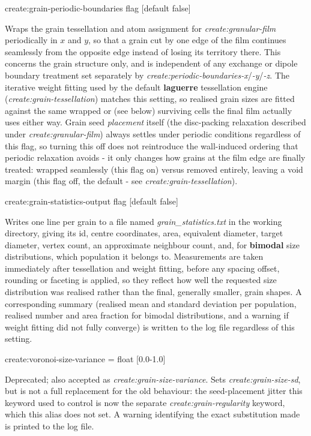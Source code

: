 {\zicf create:grain-periodic-boundaries flag [default false]} Wraps the grain tessellation and atom assignment for \textit{create:granular-film} periodically in $x$ and $y$, so that a grain cut by one edge of the film continues seamlessly from the opposite edge instead of losing its territory there. This concerns the grain structure only, and is independent of any exchange or dipole boundary treatment set separately by \textit{create:periodic-boundaries-x}/\textit{-y}/\textit{-z}. The iterative weight fitting used by the default \textbf{laguerre} tessellation engine (\textit{create:grain-tessellation}) matches this setting, so realised grain sizes are fitted against the same wrapped or (see below) surviving cells the final film actually uses either way. Grain seed \emph{placement} itself (the disc-packing relaxation described under \textit{create:granular-film}) always settles under periodic conditions regardless of this flag, so turning this off does not reintroduce the wall-induced ordering that periodic relaxation avoids - it only changes how grains at the film edge are finally treated: wrapped seamlessly (this flag on) versus removed entirely, leaving a void margin (this flag off, the default - see \textit{create:grain-tessellation}).

{\zicf create:grain-statistics-output flag [default false]} Writes one line per grain to a file named \textit{grain\_statistics.txt} in the working directory, giving its id, centre coordinates, area, equivalent diameter, target diameter, vertex count, an approximate neighbour count, and, for \textbf{bimodal} size distributions, which population it belongs to. Measurements are taken immediately after tessellation and weight fitting, before any spacing offset, rounding or faceting is applied, so they reflect how well the requested size distribution was realised rather than the final, generally smaller, grain shapes. A corresponding summary (realised mean and standard deviation per population, realised number and area fraction for bimodal distributions, and a warning if weight fitting did not fully converge) is written to the log file regardless of this setting.

{\zicf create:voronoi-size-variance = float [0.0-1.0]} Deprecated; also accepted as \textit{create:grain-size-variance}. Sets \textit{create:grain-size-sd}, but is not a full replacement for the old behaviour: the seed-placement jitter this keyword used to control is now the separate \textit{create:grain-regularity} keyword, which this alias does not set. A warning identifying the exact substitution made is printed to the log file.

